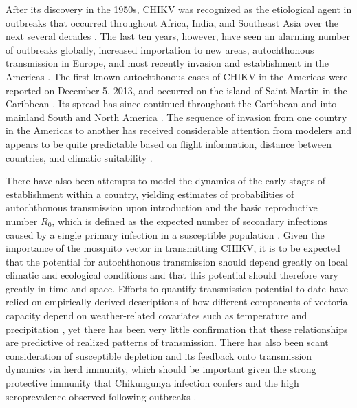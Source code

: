 \documentclass[11pt]{article}
\begin{document}
After its discovery in the 1950s, CHIKV was recognized as the etiological agent in outbreaks that occurred throughout Africa, India, and Southeast Asia over the next several decades \cite{Powers2007,Weaver2010,Weaver2014}. The last ten years, however, have seen an alarming number of outbreaks globally, increased importation to new areas, autochthonous transmission in Europe, and most recently invasion and establishment in the Americas \cite{Weaver2014,Staples2014}. The first known autochthonous cases of CHIKV in the Americas were reported on December 5, 2013, and occurred on the island of Saint Martin in the Caribbean \cite{Leparc2014}. Its spread has since continued throughout the Caribbean and into mainland South and North America \cite{Staples2014}. The sequence of invasion from one country in the Americas to another has received considerable attention from modelers and appears to be quite predictable based on flight information, distance between countries, and climatic suitability \cite{Tatem2012,Johansson2014,Cauchemez2014,Khan2014}.

There have also been attempts to model the dynamics of the early stages of establishment within a country, yielding estimates of probabilities of autochthonous transmission upon introduction \cite{Ruiz-Moreno2012,Johansson2014} and the basic reproductive number $R_0$, which is defined as the expected number of secondary infections caused by a single primary infection in a susceptible population \cite{Cauchemez2014}. Given the importance of the mosquito vector in transmitting CHIKV, it is to be expected that the potential for autochthonous transmission should depend greatly on local climatic and ecological conditions \cite{Chan2012,Brady2014} and that this potential should therefore vary greatly in time and space. Efforts to quantify transmission potential to date have relied on empirically derived descriptions of how different components of vectorial capacity depend on weather-related covariates such as temperature and precipitation \cite{Ruiz-Moreno2012,Johansson2014}, yet there has been very little confirmation that these relationships are predictive of realized patterns of transmission. There has also been scant consideration of susceptible depletion and its feedback onto transmission dynamics via herd immunity, which should be important given the strong protective immunity that Chikungunya infection confers \cite{Pialoux2007,Staples2009} and the high seroprevalence observed following outbreaks \cite{Josseran2006,Sissoko2008,Schwarz2012}.
\end{document}
